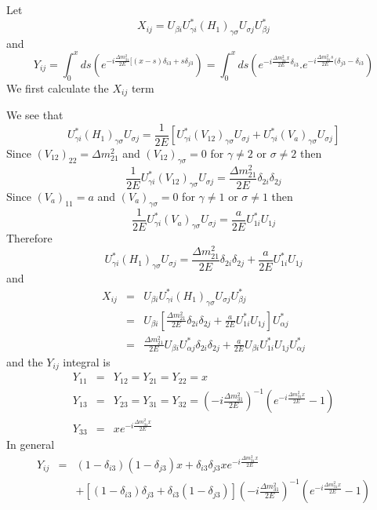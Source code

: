 \documentclass[a4 paper,12pt]{report}%
\begin{document}
Let 
$$X_{ij} =U_{\beta i}U^*_{\gamma i} (H_1)_{\gamma \sigma}U_{\sigma j}U^*_{\beta j}$$ 
and 
$$Y_{ij} = \int^x_0ds\left(e^{-i\frac{\Delta m^2_{31}}{2E}[(x-s)\delta_{i3}+ s\delta_{j3}}\right)= \int^x_0ds\left(e^{-i\frac{\Delta m^2_{31}x}{2E}\delta_{i3}}.e^{-i\frac{\Delta m^2_{31}s}{2E}(\delta_{j3} -\delta_{i3}}\right)$$
We first calculate the $X_{ij}$ term\par
We see that $$U^*_{\gamma i} (H_1)_{\gamma \sigma}U_{\sigma j} = \frac{1}{2E}[U^*_{\gamma i} (V_{12})_{\gamma \sigma}U_{\sigma j}+U^*_{\gamma i} (V_a)_{\gamma \sigma}U_{\sigma j}]$$
Since $(V_{12})_{22} = \Delta m^2_{21}$ and $(V_{12})_{\gamma \sigma} = 0$ for $\gamma \not= 2$ or $\sigma \not= 2$ then
$$\frac{1}{2E}U^*_{\gamma i} (V_{12})_{\gamma \sigma}U_{\sigma j} = \frac{\Delta m^2_{21}}{2E}\delta_{2i}\delta_{2j}$$
Since $(V_{a})_{11} =a$ and $(V_{a})_{\gamma \sigma} = 0$ for $\gamma \not= 1$ or $\sigma \not= 1$ then
$$\frac{1}{2E}U^*_{\gamma i} (V_{a})_{\gamma \sigma}U_{\sigma j} = \frac{a}{2E}U^*_{1i}U_{1j}$$ 
Therefore
$$U^*_{\gamma i} (H_1)_{\gamma \sigma}U_{\sigma j} = \frac{\Delta m^2_{21}}{2E}\delta_{2i}\delta_{2j}+  \frac{a}{2E}U^*_{1i}U_{1j}$$
and
 \begin{eqnarray}\label{66}\nonumber
X_{ij} &=&U_{\beta i}U^*_{\gamma i} (H_1)_{\gamma \sigma}U_{\sigma j}U^*_{\beta j}\\ \nonumber
&=&U_{\beta i}\left[\frac{\Delta m^2_{21}}{2E}\delta_{2i}\delta_{2j}+  \frac{a}{2E}U^*_{1i}U_{1j}\right] U^*_{\alpha j}\\ 
&=&\frac{\Delta m^2_{21}}{2E}U_{\beta i} U^*_{\alpha j}\delta_{2i}\delta_{2j}+  \frac{a}{2E}U_{\beta i}U^*_{1i}U_{1j} U^*_{\alpha j}
\end{eqnarray}
and the $Y_{ij}$ integral is
 \begin{eqnarray}\nonumber
Y_{11} &=&Y_{12} = Y_{21} = Y_{22} = x\\ \nonumber 
Y_{13} &=&Y_{23} = Y_{31} = Y_{32} = \left(-i\frac{\Delta m^2_{31}}{2E}\right)^{-1}\left(e^{-i\frac{\Delta m^2_{31}x}{2E}}-1\right)\\ \nonumber 
Y_{33} &=&xe^{-i\frac{\Delta m^2_{31}x}{2E}}
\end{eqnarray}
In general
 \begin{eqnarray}\label{67}
Y_{ij} &=& (1-\delta_{i3})(1-\delta_{j3})x + \delta_{i3}\delta_{j3}xe^{-i\frac{\Delta m^2_{31}x}{2E}} \\ \nonumber
&&+[(1-\delta_{i3})\delta_{j3} + \delta_{i3}(1-\delta_{j3})]\left(-i\frac{\Delta m^2_{31}}{2E}\right)^{-1}\left(e^{-i\frac{\Delta m^2_{31}x}{2E}}-1\right)
\end{eqnarray}
\end{document}
